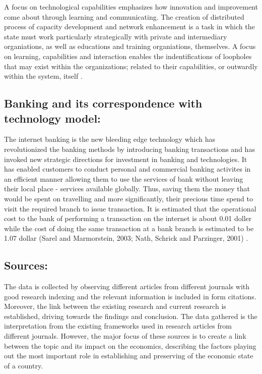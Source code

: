 \documentclass[]{article}
\begin{document}
A focus on technological capabilities emphasizes how innovation and improvement come about through learning and communicating. The creation of distributed process of capacity development and network enhancement is a task in which the state must work particularly strategically with private and intermediary organiations, as well as educations and training organiations, themselves. A focus on learning, capabilities and interaction enables the indentifications of loopholes that may exist within the organizations; related to their capabilities, or outwardly within the system, itself \cite{Gle15}.

\subsection{Banking and its correspondence with technology model:}

The internet banking is the new bleeding edge technology which has revolutionized the banking methods by introducing banking transactions and has invoked new strategic directions for investment in banking and technologies. It has enabled customers to conduct personal and commercial banking activites in an efficient manner allowing them to use the services of bank without leaving their local place - services available globally. Thus, saving them the money that would be spent on travelling and more significantly, their precious time spend to visit the required branch to issue transaction. It is estimated that the operational cost to the bank of performing a transaction on the internet is about 0.01 doller while the cost of doing the same transaction at a bank branch is estimated to be 1.07 dollar (Sarel and Marmorstein, 2003; Nath, Schrick and Parzinger,
2001) \cite{Hum14}.

\subsection{Sources:}

The data is collected by observing different articles from different journals with good research indexing and the relevant information is included in form citations. Moreover, the link between the existing research and current research is established, driving towards the findings and conclusion. The data gathered is the interpretation from the existing frameworks used in research articles from different journals. However, the major focus of these sources is to create a link between the topic and its impact on the economics, describing the factors playing out the most important role in establishing and preserving of the economic state of a country.
\end{document}
